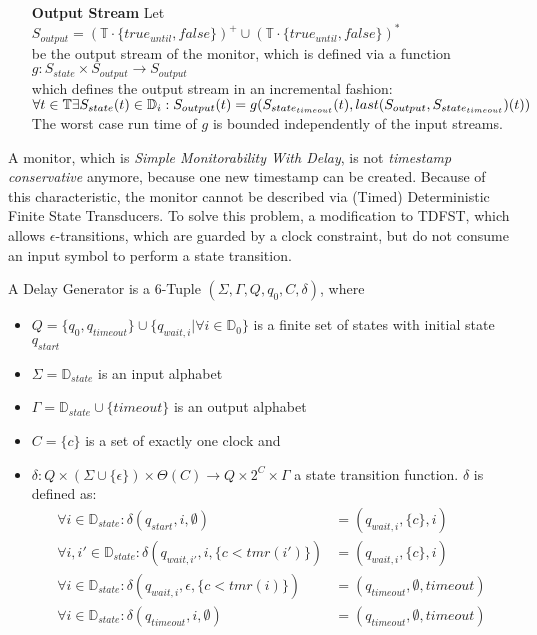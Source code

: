 \begin{definition}
\begin{itemize}
			\item[\textbf{Output Stream}]
				Let $S_{output}= (\mathbb{T}\cdot \{true_{until}, false\})^+\cup(\mathbb{T}\cdot \{true_{until}, false\})^*$\\
				be the output stream of the monitor, which is defined via a function\\
				$g:S_{state}\times S_{output}\rightarrow S_{output}$\\
				which defines the output stream in an incremental fashion:\\
				\begin{math}
					\forall t\in \mathbb T \exists S_{state}(t)\in\mathbb D_i:\\
					S_{output}(t)= g(S_{state_{timeout}}(t), last(S_{output}, S_{state_{timeout}})(t))
				\end{math} 
				The worst case run time of $g$ is bounded independently of the input streams.
		\end{itemize}
	\end{definition}
		A monitor, which is \textit{Simple Monitorability With Delay}, is not \textit{timestamp conservative} anymore, because one new timestamp can be created. Because of this characteristic, the monitor cannot be described via (Timed) Deterministic Finite State Transducers. To solve this problem, a modification to TDFST, which allows $\epsilon$-transitions, which are guarded by a clock constraint, but do not consume an input symbol to perform a state
		transition.
		\begin{definition}
			A Delay Generator is a 6-Tuple $(\Sigma, \Gamma, Q, q_0, C, \delta)$, where
			\begin{itemize}
				\item
					$Q = \{q_{0}, q_{timeout}\}\cup\{q_{wait,i} | \forall i\in \mathbb{D}_{0}\}$ is a finite set of states with initial state $q_{start}$
				\item
					$\Sigma = \mathbb D_{state}$ is an input alphabet
				\item
					$\Gamma = \mathbb D_{state} \cup \{timeout\}$ is an output alphabet
				\item
					$C=\{c\}$ is a set of exactly one clock and
				\item
					$\delta:Q\times(\Sigma\cup\{\epsilon\})\times\Theta(C)\rightarrow Q\times 2^C\times\Gamma$ a state transition function. $\delta$ is defined as:
					\begin{align}
						\forall i\in \mathbb{D}_{state}:\delta(q_{start}, i, \emptyset) &= (q_{wait,i}, \{c\}, i)\\
						\forall i, i'\in \mathbb{D}_{state}:\delta(q_{wait, i'}, i, \{c < tmr(i')\}) &= (q_{wait,i}, \{c\}, i)\\
						\forall i \in \mathbb{D}_{state}:\delta(q_{wait, i}, \epsilon, \{c < tmr(i)\}) &= (q_{timeout}, \emptyset, timeout)\\
						\forall i \in \mathbb{D}_{state}:\delta(q_{timeout}, i, \emptyset) &= (q_{timeout}, \emptyset, timeout)
					\end{align}
			\end{itemize}
		\end{definition}
